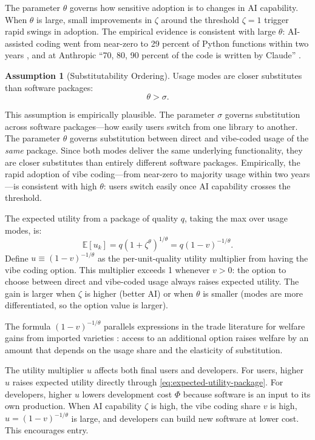 \documentclass[11pt,a4paper]{article}
\theoremstyle{definition}
\newtheorem{assumption}{Assumption}
\theoremstyle{remark}
\begin{document}
The parameter \(\theta\) governs how sensitive adoption is to changes in
AI capability. When \(\theta\) is large, small improvements in \(\zeta\)
around the threshold \(\zeta = 1\) trigger rapid swings in adoption. The
empirical evidence is consistent with large \(\theta\): AI-assisted
coding went from near-zero to 29 percent of Python functions within two
years \citep{daniotti-2025-ai-code}, and at Anthropic ``70, 80, 90
percent of the code is written by Claude'' \citep{amodei-2025}.

\begin{assumption}[Substitutability Ordering]\label{ass:substitutability}
Usage modes are closer substitutes than software packages:
$$
\theta > \sigma.
$$
\end{assumption}

This assumption is empirically plausible. The parameter \(\sigma\)
governs substitution across software packages---how easily users switch
from one library to another. The parameter
\(\theta\) governs substitution between direct and vibe-coded usage of
the \emph{same} package. Since both modes deliver the same underlying
functionality, they are closer substitutes than entirely different
software packages. Empirically, the rapid adoption of vibe coding---from
near-zero to majority usage within two years---is consistent with high
\(\theta\): users switch easily once AI capability crosses the
threshold. 

The expected utility from a package of quality \(q\), taking the max
over usage modes, is: \begin{equation}
\mathbb{E}[u_k] = q(1 + \zeta^{\theta})^{1/\theta} = q(1-v)^{-1/\theta}. \label{eq:expected-utility-package}
\end{equation} Define \(u \equiv (1-v)^{-1/\theta}\) as the
per-unit-quality utility multiplier from having the vibe coding option.
This multiplier exceeds 1 whenever \(v > 0\): the option to choose
between direct and vibe-coded usage always raises expected utility. The
gain is larger when \(\zeta\) is higher (better AI) or when \(\theta\)
is smaller (modes are more differentiated, so the option value is
larger).

The formula \((1-v)^{-1/\theta}\) parallels expressions in the trade
literature for welfare gains from imported varieties \citep{arkolakis-costinot-rodriguez-clare-2012,halpern-koren-szeidl-2015}: access to an additional option raises welfare by an amount that depends on the usage share and
the elasticity of substitution.

The utility multiplier \(u\) affects both final users and developers.
For users, higher \(u\) raises expected utility directly through
\eqref{eq:expected-utility-package}. For developers, higher \(u\) lowers
development cost \(\Phi\) because software is an input to its own
production. When AI capability \(\zeta\) is high, the vibe coding share
\(v\) is high, \(u = (1-v)^{-1/\theta}\) is large, and developers can
build new software at lower cost. This encourages entry.
\end{document}
